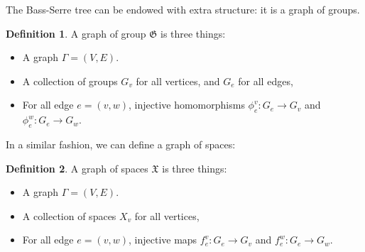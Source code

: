 \documentclass[11pt]{article}
\theoremstyle{definition}
\newtheorem{definition}{Definition}[section]
\theoremstyle{example}
\theoremstyle{remark}
\theoremstyle{lemma}
\theoremstyle{proposition}
\theoremstyle{Problem}
\theoremstyle{Solution}
\theoremstyle{theorem}
\theoremstyle{corollary}
\begin{document}
The Bass-Serre tree can be endowed with extra structure: it is a graph of groups.
\begin{definition}
A graph of group $\mathfrak{G}$ is three things:
\begin{itemize}
\item A graph $\Gamma = (V,E)$.
\item A collection of groups $G_v$ for all vertices, and $G_e$ for all edges,
\item For all edge $e=(v,w)$, injective homomorphisms $\phi_e^v:G_e \to G_v$ and $\phi_e^w:G_e \to G_w$.
\end{itemize}
\end{definition}
In a similar fashion, we can define a graph of spaces:
\begin{definition}
A graph of spaces $\mathfrak{X}$ is three things:
\begin{itemize}
\item A graph $\Gamma = (V,E)$.
\item A collection of spaces $X_v$ for all vertices, 
\item For all edge $e=(v,w)$, injective maps $f_e^v:G_e \to G_v$ and $f_e^w:G_e \to G_w$.
\end{itemize}
\end{definition}
\end{document}
